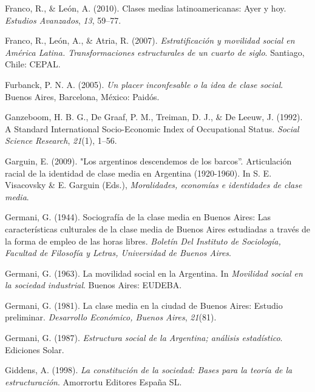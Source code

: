 \documentclass[
]{article}
\newlength{\cslhangindent}
\newlength{\cslentryspacingunit} %
\newenvironment{CSLReferences}[2] %
 {%
  \setlength{\parindent}{0pt}
  \ifodd #1
  \let\oldpar\par
  \def\par{\hangindent=\cslhangindent\oldpar}
  \fi
  \setlength{\parskip}{#2\cslentryspacingunit}
 }%
 {}
\begin{document}
\begin{CSLReferences}{1}{0}
\leavevmode{}%
Franco, R., \& León, A. (2010). Clases medias latinoamericanas: Ayer y hoy. \emph{Estudios Avanzados}, \emph{13}, 59--77.

\leavevmode{}%
Franco, R., León, A., \& Atria, R. (2007). \emph{Estratificación y movilidad social en {América} {Latina}. {Transformaciones} estructurales de un cuarto de siglo}. Santiago, Chile: CEPAL.

\leavevmode{}%
Furbanck, P. N. A. (2005). \emph{Un placer inconfesable o la idea de clase social}. Buenos Aires, Barcelona, México: Paidós.

\leavevmode{}%
Ganzeboom, H. B. G., De Graaf, P. M., Treiman, D. J., \& De Leeuw, J. (1992). A {Standard} {International} {Socio}-{Economic} {Index} of {Occupational} {Status}. \emph{Social Science Research}, \emph{21}(1), 1--56.

\leavevmode{}%
Garguin, E. (2009). "{Los} argentinos descendemos de los barcos''. {Articulación} racial de la identidad de clase media en {Argentina} (1920-1960). In S. E. Visacovsky \& E. Garguin (Eds.), \emph{Moralidades, economías e identidades de clase media}.

\leavevmode{}%
Germani, G. (1944). Sociografía de la clase media en {Buenos} {Aires}: {Las} características culturales de la clase media de {Buenos} {Aires} estudiadas a través de la forma de empleo de las horas libres. \emph{Boletín Del Instituto de Sociología, Facultad de Filosofía y Letras, Universidad de Buenos Aires}.

\leavevmode{}%
Germani, G. (1963). La movilidad social en la {Argentina}. In \emph{Movilidad social en la sociedad industrial}. Buenos Aires: EUDEBA.

\leavevmode{}%
Germani, G. (1981). La clase media en la ciudad de {Buenos} {Aires}: {Estudio} preliminar. \emph{Desarrollo Económico, Buenos Aires}, \emph{21}(81).

\leavevmode{}%
Germani, G. (1987). \emph{Estructura social de la {Argentina}; análisis estadístico}. Ediciones Solar.

\leavevmode{}%
Giddens, A. (1998). \emph{La constitución de la sociedad: Bases para la teoría de la estructuración}. Amorrortu Editores España SL.


\end{CSLReferences}
\end{document}
